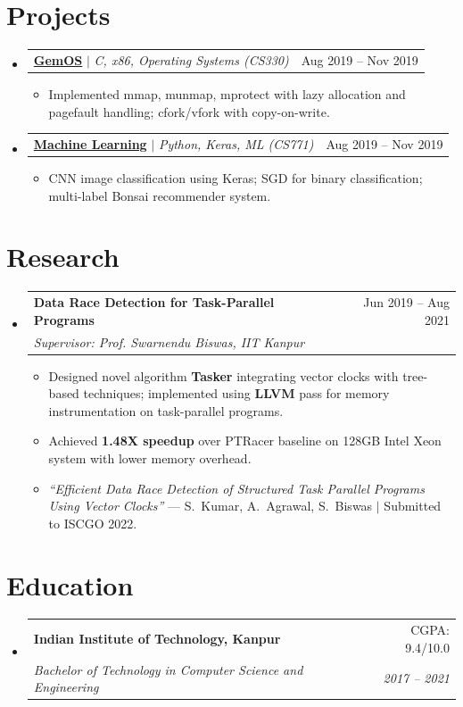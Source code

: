 \documentclass[a4paper,9pt]{extarticle}
\makeatletter
\newcommand{\resumeSubheading}[4]{
  \vspace{-2pt}\item
    \begin{tabular*}{0.97\textwidth}[t]{l@{\extracolsep{\fill}}r}
      \textbf{#1} & #2 \\
      \textit{\small #3} & \textit{\small #4} \\
    \end{tabular*}\vspace{-6pt}
}
\newcommand{\resumeProjectHeading}[2]{
    \item
    \begin{tabular*}{0.97\textwidth}{l@{\extracolsep{\fill}}r}
      \small #1 & #2 \\
    \end{tabular*}\vspace{-7pt}
}
\newcommand{\resumeItemPlain}[1]{
  \item\small{#1 \vspace{-3pt}}
}
\newcommand{\resumeSubHeadingListStart}{\begin{itemize}[leftmargin=0.15in, label={}]}
\newcommand{\resumeSubHeadingListEnd}{\end{itemize}}
\newcommand{\resumeItemListStart}{\begin{itemize}}
\newcommand{\resumeItemListEnd}{\end{itemize}\vspace{-6pt}}
\makeatother
\begin{document}
\section{Projects}
  \resumeSubHeadingListStart
    \resumeProjectHeading
      {\href{https://github.com/shivamkm/gemOS}{\textbf{GemOS}} $|$ \emph{C, x86, Operating Systems (CS330)}}{Aug 2019 -- Nov 2019}
      \resumeItemListStart
        \resumeItemPlain{Implemented mmap, munmap, mprotect with lazy allocation and pagefault handling; cfork/vfork with copy-on-write.}
      \resumeItemListEnd
    \resumeProjectHeading
      {\href{https://github.com/shivamkm/machine-learning}{\textbf{Machine Learning}} $|$ \emph{Python, Keras, ML (CS771)}}{Aug 2019 -- Nov 2019}
      \resumeItemListStart
        \resumeItemPlain{CNN image classification using Keras; SGD for binary classification; multi-label Bonsai recommender system.}
      \resumeItemListEnd
  \resumeSubHeadingListEnd

\section{Research}
  \resumeSubHeadingListStart
    \resumeSubheading
      {Data Race Detection for Task-Parallel Programs}{Jun 2019 -- Aug 2021}
      {Supervisor: Prof. Swarnendu Biswas, IIT Kanpur}{}
      \resumeItemListStart
        \resumeItemPlain{Designed novel algorithm \textbf{Tasker} integrating vector clocks with tree-based techniques; implemented using \textbf{LLVM} pass for memory instrumentation on task-parallel programs.}
        \resumeItemPlain{Achieved \textbf{1.48X speedup} over PTRacer baseline on 128GB Intel Xeon system with lower memory overhead.}
        \resumeItemPlain{\textit{``Efficient Data Race Detection of Structured Task Parallel Programs Using Vector Clocks''} --- S.~Kumar, A.~Agrawal, S.~Biswas $|$ Submitted to ISCGO 2022.}
      \resumeItemListEnd
  \resumeSubHeadingListEnd

\section{Education}
  \resumeSubHeadingListStart
    \resumeSubheading
      {Indian Institute of Technology, Kanpur}{CGPA: 9.4/10.0}
      {Bachelor of Technology in Computer Science and Engineering}{2017 -- 2021}
  \resumeSubHeadingListEnd

\end{document}
